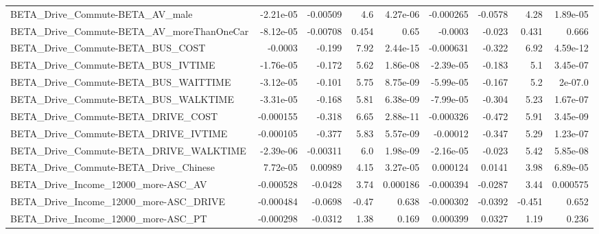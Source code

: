 \begin{tabular}{lrrrrrrrr}
BETA\_Drive\_Commute-BETA\_AV\_male                    &   -2.21e-05 &     -0.00509 &       4.6 & 4.27e-06 &  -0.000265 &     -0.0578 &         4.28 &      1.89e-05 \\
BETA\_Drive\_Commute-BETA\_AV\_moreThanOneCar          &   -8.12e-05 &     -0.00708 &     0.454 &     0.65 &    -0.0003 &      -0.023 &        0.431 &         0.666 \\
BETA\_Drive\_Commute-BETA\_BUS\_COST                   &     -0.0003 &       -0.199 &      7.92 & 2.44e-15 &  -0.000631 &      -0.322 &         6.92 &      4.59e-12 \\
BETA\_Drive\_Commute-BETA\_BUS\_IVTIME                 &   -1.76e-05 &       -0.172 &      5.62 & 1.86e-08 &  -2.39e-05 &      -0.183 &          5.1 &      3.45e-07 \\
BETA\_Drive\_Commute-BETA\_BUS\_WAITTIME               &   -3.12e-05 &       -0.101 &      5.75 & 8.75e-09 &  -5.99e-05 &      -0.167 &          5.2 &       2e-07.0 \\
BETA\_Drive\_Commute-BETA\_BUS\_WALKTIME               &   -3.31e-05 &       -0.168 &      5.81 & 6.38e-09 &  -7.99e-05 &      -0.304 &         5.23 &      1.67e-07 \\
BETA\_Drive\_Commute-BETA\_DRIVE\_COST                 &   -0.000155 &       -0.318 &      6.65 & 2.88e-11 &  -0.000326 &      -0.472 &         5.91 &      3.45e-09 \\
BETA\_Drive\_Commute-BETA\_DRIVE\_IVTIME               &   -0.000105 &       -0.377 &      5.83 & 5.57e-09 &   -0.00012 &      -0.347 &         5.29 &      1.23e-07 \\
BETA\_Drive\_Commute-BETA\_DRIVE\_WALKTIME             &   -2.39e-06 &     -0.00311 &       6.0 & 1.98e-09 &  -2.16e-05 &      -0.023 &         5.42 &      5.85e-08 \\
BETA\_Drive\_Commute-BETA\_Drive\_Chinese              &    7.72e-05 &      0.00989 &      4.15 & 3.27e-05 &   0.000124 &      0.0141 &         3.98 &      6.89e-05 \\
BETA\_Drive\_Income\_12000\_more-ASC\_AV                &   -0.000528 &      -0.0428 &      3.74 & 0.000186 &  -0.000394 &     -0.0287 &         3.44 &      0.000575 \\
BETA\_Drive\_Income\_12000\_more-ASC\_DRIVE             &   -0.000484 &      -0.0698 &     -0.47 &    0.638 &  -0.000302 &     -0.0392 &       -0.451 &         0.652 \\
BETA\_Drive\_Income\_12000\_more-ASC\_PT                &   -0.000298 &      -0.0312 &      1.38 &    0.169 &   0.000399 &      0.0327 &         1.19 &         0.236 \\

\end{tabular}
